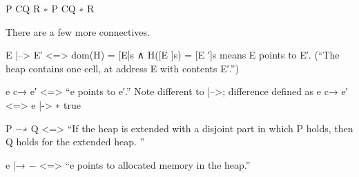 {P }C{Q} 
{R ∗ P }C{Q ∗ R} 

There are a few more connectives.

  E |--> E′ <=> dom(H) = { [E]s } ∧ H([E ]s) = [E ′]s
means E points to E′. (“The heap contains one cell, at address E with contents E′.”)

e  c→  e′ <=>  “e points to e′.”  Note different to |-->; difference defined as
  e  c→  e′  <=>  e |-> ∗ true

P −∗ Q <=> “If the heap is extended with a disjoint part in which P holds, then Q holds for the extended heap. ”

  e |→ −  <=> “e points to allocated memory in the heap.”
